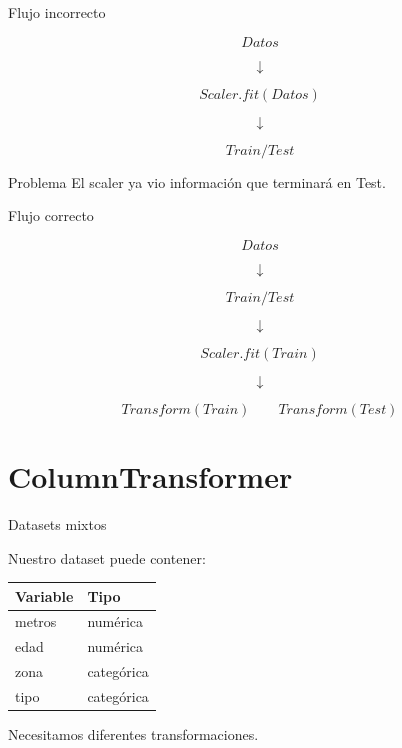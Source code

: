 \documentclass[aspectratio=169,11pt]{beamer}
\begin{document}

\begin{frame}{Flujo incorrecto}

\[
Datos
\]

\[
\downarrow
\]

\[
Scaler.fit(Datos)
\]

\[
\downarrow
\]

\[
Train/Test
\]

\vspace{0.4cm}

\begin{alertblock}{Problema}
El scaler ya vio información que terminará en Test.
\end{alertblock}

\end{frame}


\begin{frame}{Flujo correcto}

\[
Datos
\]

\[
\downarrow
\]

\[
Train/Test
\]

\[
\downarrow
\]

\[
Scaler.fit(Train)
\]

\[
\downarrow
\]

\[
Transform(Train)
\qquad
Transform(Test)
\]

\end{frame}

\section{ColumnTransformer}

\begin{frame}{Datasets mixtos}

Nuestro dataset puede contener:

\begin{center}

\begin{tabular}{ll}
\toprule
Variable & Tipo \\
\midrule
metros & numérica \\
edad & numérica \\
zona & categórica \\
tipo & categórica \\
\bottomrule
\end{tabular}

\end{center}

Necesitamos diferentes transformaciones.

\end{frame}
\end{document}
